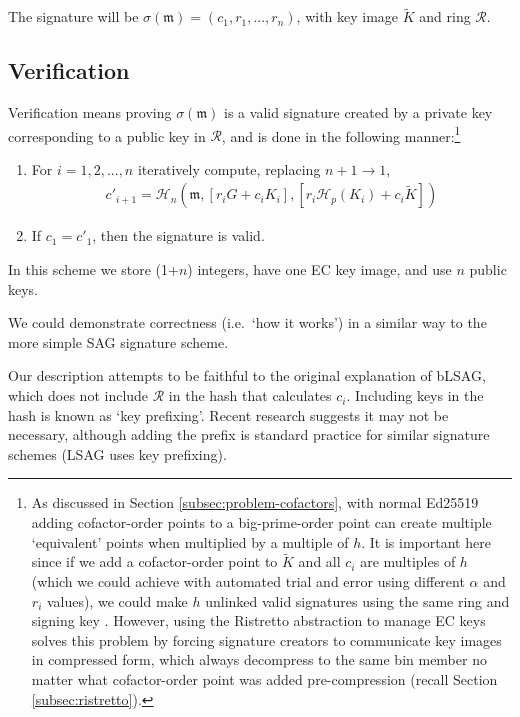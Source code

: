 The signature will be \(\sigma(\mathfrak{m}) = (c_1, r_1, ..., r_n)\), with key image $\tilde{K}$ and ring $\mathcal{R}$.


\subsection*{Verification}

Verification means proving $\sigma(\mathfrak{m})$ is a valid signature created by a private key corresponding to a public key in $\mathcal{R}$, and is done in the following manner:\footnote{As discussed in Section \ref{subsec:problem-cofactors}, with normal Ed25519 adding cofactor-order points to a big-prime-order point can create multiple `equivalent' points when multiplied by a multiple of $h$. It is important here since if we add a cofactor-order point to $\tilde{K}$ and all $c_i$ are multiples of $h$ (which we could achieve with automated trial and error using different $\alpha$ and $r_i$ values), we could make $h$ unlinked valid signatures using the same ring and signing key \cite{key-image-bug}. However, using the Ristretto abstraction to manage EC keys solves this problem by forcing signature creators to communicate key images in compressed form, which always decompress to the same bin member no matter what cofactor-order point was added pre-compression (recall Section \ref{subsec:ristretto}).}

\begin{enumerate}
	\item For \(i = 1, 2, ..., n\) iteratively compute, replacing \(n + 1 \rightarrow 1\),\vspace{.175cm}
	\begin{align*}
	c'_{i+1} = \mathcal{H}_n(\mathfrak{m}, [r_i G + c_i {K_i}], [r_i \mathcal{H}_p(K_i) + c_i \tilde{K}])
	\end{align*}

	\item If \(c_1 = c'_1\), then the signature is valid.
\end{enumerate}

In this scheme we store (1+$n$) integers, have one EC key image, and use $n$ public keys.

We could demonstrate correctness (i.e.\ `how it works') in a similar way to the more simple SAG signature scheme.

Our description attempts to be faithful to the original explanation of bLSAG, which does not include $\mathcal{R}$ in the hash that calculates $c_i$. Including keys in the hash is known as `key prefixing'. Recent research \cite{key-prefix-paper} suggests it may not be necessary, although adding the prefix is standard practice for similar signature schemes (LSAG uses key prefixing).


